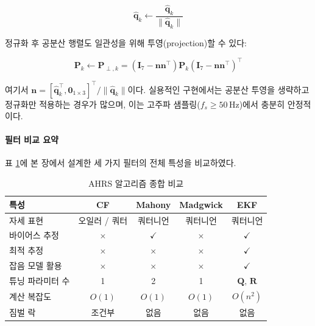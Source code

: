 \begin{equation}
    \hat{\mathbf{q}}_k \leftarrow \frac{\hat{\mathbf{q}}_k}{\|\hat{\mathbf{q}}_k\|}
    \label{eq:ekf_quat_normalize}
\end{equation}

정규화 후 공분산 행렬도 일관성을 위해 투영(projection)할 수 있다:

\begin{equation}
    \mathbf{P}_k \leftarrow \mathbf{P}_{\perp,k} = \left(\mathbf{I}_7 - \mathbf{n}\mathbf{n}^\top\right)\mathbf{P}_k\left(\mathbf{I}_7 - \mathbf{n}\mathbf{n}^\top\right)^\top
    \label{eq:ekf_cov_project}
\end{equation}

\noindent 여기서 $\mathbf{n} = [\hat{\mathbf{q}}_k^\top, \mathbf{0}_{1\times 3}]^\top / \|\hat{\mathbf{q}}_k\|$이다.
실용적인 구현에서는 공분산 투영을 생략하고 정규화만 적용하는 경우가 많으며,
이는 고주파 샘플링($f_s \geq 50\,\text{Hz}$)에서 충분히 안정적이다.

\paragraph{필터 비교 요약}

표 \ref{tab:filter_full_comparison}에 본 장에서 설계한 세 가지 필터의
전체 특성을 비교하였다.

\begin{table}[H]
    \centering
    \caption{AHRS 알고리즘 종합 비교}
    \label{tab:filter_full_comparison}
    \begin{tabular}{lcccc}
        \toprule
        특성 & CF & Mahony & Madgwick & EKF \\
        \midrule
        자세 표현 & 오일러 / 쿼터 & 쿼터니언 & 쿼터니언 & 쿼터니언 \\
        바이어스 추정 & $\times$ & $\checkmark$ & $\times$ & $\checkmark$ \\
        최적 추정 & $\times$ & $\times$ & $\times$ & $\checkmark$ \\
        잡음 모델 활용 & $\times$ & $\times$ & $\times$ & $\checkmark$ \\
        튜닝 파라미터 수 & 1 & 2 & 1 & $\mathbf{Q},\,\mathbf{R}$ \\
        계산 복잡도 & $O(1)$ & $O(1)$ & $O(1)$ & $O(n^2)$ \\
        짐벌 락 & 조건부 & 없음 & 없음 & 없음 \\
        \bottomrule
    \end{tabular}
\end{table}